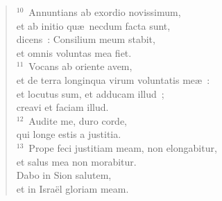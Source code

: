 \begin{flushleft}
\begin{verse}
${}^{10}$~Annuntians ab exordio novissimum,\\ et ab initio qu\ae\ necdum facta sunt,\\ dicens~: Consilium meum stabit,\\ et omnis voluntas mea fiet.\\
${}^{11}$~Vocans ab oriente avem,\\ et de terra longinqua virum voluntatis me\ae~:\\ et locutus sum, et adducam illud~;\\ creavi et faciam illud.\\
${}^{12}$~Audite me, duro corde,\\ qui longe estis a justitia.\\
${}^{13}$~Prope feci justitiam meam, non elongabitur,\\ et salus mea non morabitur.\\ Dabo in Sion salutem,\\ et in Isra\"el gloriam meam.\end{verse}\end{flushleft}


